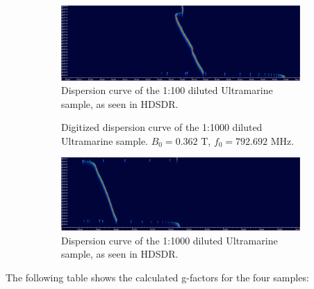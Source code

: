 \documentclass{article}
\begin{document}
\begin{figure}[h]
\begin{subfigure}[t]{0.45\textwidth}
		\label{fig:Ultramarine100Digitized}
	\end{subfigure}
	\hfill
	\begin{subfigure}[t]{0.45\textwidth}
		\centering
		\includegraphics[width=\textwidth]{Figures/Task 5/Ultramarine100.png}
		\caption{Dispersion curve of the 1:100 diluted Ultramarine sample, as seen in HDSDR.}
		\label{fig:Ultramarine100}
	\end{subfigure}
	\hfill
	\begin{subfigure}[t]{0.45\textwidth}
		\centering
		\scalebox{0.44}{}
		\caption{Digitized dispersion curve of the 1:1000 diluted Ultramarine sample. $B_0 = 0.362$ T, $f_0 = 792.692$ MHz.}
		\label{fig:Ultramarine1000Digitized}
	\end{subfigure}
	\hfill
	\begin{subfigure}[t]{0.45\textwidth}
		\centering
		\includegraphics[width=\textwidth]{Figures/Task 5/Ultramarine1000.png}
		\caption{Dispersion curve of the 1:1000 diluted Ultramarine sample, as seen in HDSDR.}
		\label{fig:Ultramarine1000}
	\end{subfigure}
	\caption{}
	\label{fig:UltramarinePlots}
\end{figure}

\pagebreak{}

The following table shows the calculated g-factors for the four samples:
\end{document}
